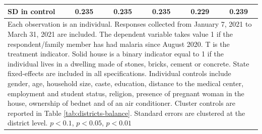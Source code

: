 {{\begin{tabular}{l*{5}{c}}
SD in control   &    0.235         &    0.235         &    0.235         &    0.229         &    0.239         \\
\hline\hline
\multicolumn{6}{p{0.85\linewidth}}{\scriptsize Each observation is an individual. Responses collected from January 7, 2021 to March 31, 2021 are included. The dependent variable takes value 1 if the respondent/family member has had malaria since August 2020. T is the treatment indicator. Solid house is a binary indicator equal to 1 if the individual lives in a dwelling made of stones, bricks, cement or concrete. State fixed-effects are included in all specifications. Individual controls include gender, age, household size, caste, education, distance to the medical center, employment and student status, religion, presence of pregnant woman in the house, ownership of bednet and of an air conditioner. Cluster controls are reported in Table \ref{tab:districts-balance}. Standard errors are clustered at the district level. \sym{*} \(p<0.1\), \sym{**} \(p<0.05\), \sym{***} \(p<0.01\)}\\
\end{tabular}
}%

}
